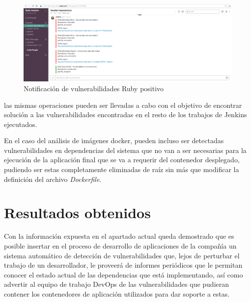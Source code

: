 \begin{figure}[htbp]
	\centering
	\includegraphics[width=1.0\linewidth]
	{desarrollo/figuras/slack_04.png}
	\caption{Notificación de vulnerabilidades Ruby positivo}
	\label{slack_04}
\end{figure}

las mismas operaciones pueden ser llevadas a cabo con el objetivo de encontrar solución a las vulnerabilidades encontradas en el resto de los trabajos de Jenkins ejecutados. 

En el caso del análisis de imágenes docker, pueden incluso ser detectadas vulnerabilidades en dependencias del sistema que no van a ser necesarias para la ejecución de la aplicación final que se va a requerir del contenedor desplegado, pudiendo ser estas completamente eliminadas de raíz sin más que modificar la definición del archivo \textit{Dockerfile}.

\section{Resultados obtenidos}

Con la información expuesta en el apartado actual queda demostrado que es posible insertar en el proceso de desarrollo de aplicaciones de la compañía un sistema automático de detección de vulnerabilidades que, lejos de perturbar el trabajo de un desarrollador, le proveerá de informes periódicos que le permitan conocer el estado actual de las dependencias que está implementando, así como advertir al equipo de trabajo DevOps de las vulnerabilidades que pudieran contener los contenedores de aplicación utilizados para dar soporte a estas.

\endinput
